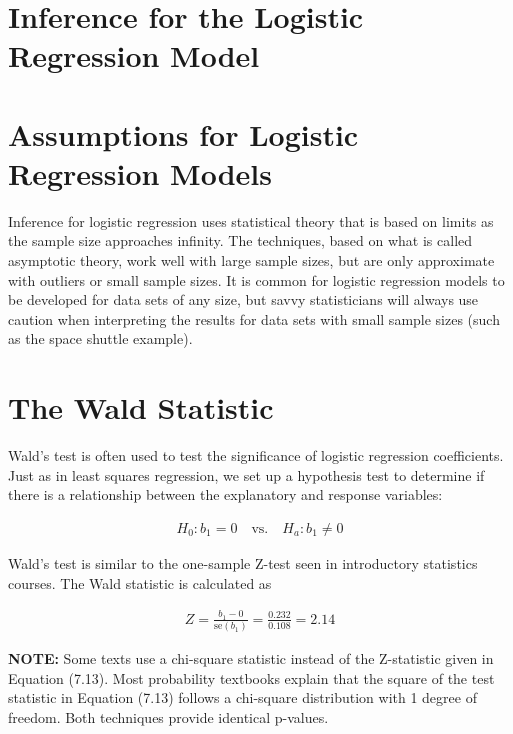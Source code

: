 \documentclass[
]{report}
\begin{document}
\section{\texorpdfstring{\textbf{Inference for the Logistic Regression Model}}{Inference for the Logistic Regression Model}}\label{inference-for-the-logistic-regression-model}

\section*{Assumptions for Logistic Regression Models}\label{assumptions-for-logistic-regression-models}

Inference for logistic regression uses statistical theory that is based on limits as the sample size approaches infinity. The techniques, based on what is called asymptotic theory, work well with large sample sizes, but are only approximate with outliers or small sample sizes. It is common for logistic regression models to be developed for data sets of any size, but savvy statisticians will always use caution when interpreting the results for data sets with small sample sizes (such as the space shuttle example).

\section*{The Wald Statistic}\label{the-wald-statistic}

Wald's test is often used to test the significance of logistic regression coefficients. Just as in least squares regression, we set up a hypothesis test to determine if there is a relationship between the explanatory and response variables:

\begin{align}
H_0: b_1 = 0 \quad \text{vs.}\quad H_a: b_1 \neq 0
\end{align}

Wald's test is similar to the one-sample Z-test seen in introductory statistics courses. The Wald statistic is calculated as

\begin{align}
Z = \frac{b_1 - 0}{\text{se}(b_1)} = \frac{0.232}{0.108} = 2.14 \tag{7.13}
\end{align}

\large

\textbf{NOTE:}
Some texts use a chi-square statistic instead of the Z-statistic given in Equation (7.13). Most probability textbooks explain that the square of the test statistic in Equation (7.13) follows a chi-square distribution with 1 degree of freedom. Both techniques provide identical p-values.
\normalsize
\end{document}
